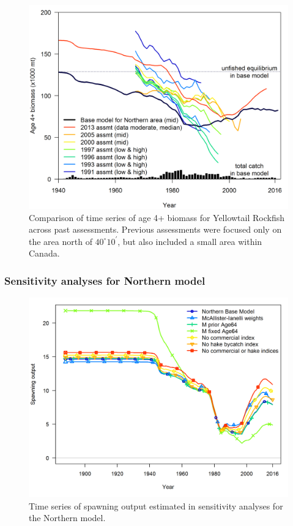 \documentclass[12pt,]{article}
\begin{document}
\FloatBarrier

\begin{figure}[htbp]
\centering
\includegraphics{Figures/historical_assessment_timeseries.png}
\caption{Comparison of time series of age 4+ biomass for Yellowtail
Rockfish across past assessments. Previous assessments were focused only
on the area north of \(40^\circ 10^\prime\), but also included a small
area within Canada. \label{fig:assessment_history}}
\end{figure}

\FloatBarrier

\newpage

\subsubsection{Sensitivity analyses for Northern
model}\label{sensitivity-analyses-for-northern-model}

\begin{figure}[htbp]
\centering
\includegraphics{Figures/North_sensitivities/compare1_spawnbio.png}
\caption{Time series of spawning output estimated in sensitivity
analyses for the Northern model. \label{fig:sens.N.spawnbio}}
\end{figure}
\end{document}
